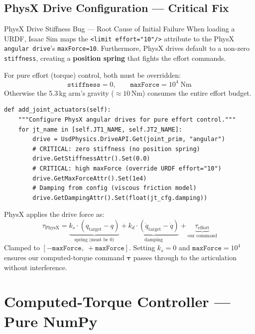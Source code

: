 \documentclass[11pt,a4paper]{article}
\newcommand{\btau}{\bm{\tau}}
\begin{document}
\subsection{PhysX Drive Configuration --- Critical Fix}

\begin{physxbox}{PhysX Drive Stiffness Bug --- Root Cause of Initial Failure}
When loading a URDF, Isaac Sim maps the \texttt{<limit effort="10"/>} attribute to the PhysX \texttt{angular drive}'s \texttt{maxForce=10}. Furthermore, PhysX drives default to a non-zero \texttt{stiffness}, creating a \textbf{position spring} that fights the effort commands.

For pure effort (torque) control, both must be overridden:
\[
    \texttt{stiffness} = 0, \qquad \texttt{maxForce} = 10^4 \;\text{Nm}
\]
Otherwise the 5.3\,kg arm's gravity ($\approx 10$\,Nm) consumes the entire effort budget.
\end{physxbox}

\begin{lstlisting}[caption={PhysX drive fix --- \texttt{robots/cup\_manipulator\_tendon\_isaac.py}}]
def add_joint_actuators(self):
    """Configure PhysX angular drives for pure effort control."""
    for jt_name in [self.JT1_NAME, self.JT2_NAME]:
        drive = UsdPhysics.DriveAPI.Get(joint_prim, "angular")
        # CRITICAL: zero stiffness (no position spring)
        drive.GetStiffnessAttr().Set(0.0)
        # CRITICAL: high maxForce (override URDF effort="10")
        drive.GetMaxForceAttr().Set(1e4)
        # Damping from config (viscous friction model)
        drive.GetDampingAttr().Set(float(jt_cfg.damping))
\end{lstlisting}

\begin{codemath}
PhysX applies the drive force as:
\[
    \tau_{\mathrm{PhysX}} = \underbrace{k_s \cdot (q_{\mathrm{target}} - q)}_{\text{spring (must be 0)}}
    + \underbrace{k_d \cdot (\dot q_{\mathrm{target}} - \dot q)}_{\text{damping}}
    + \underbrace{\tau_{\mathrm{effort}}}_{\text{our command}}
\]
Clamped to $[-\texttt{maxForce},\; +\texttt{maxForce}]$. Setting $k_s = 0$ and $\texttt{maxForce} = 10^4$ ensures our computed-torque command $\btau$ passes through to the articulation without interference.
\end{codemath}


\section{Computed-Torque Controller --- Pure NumPy}
\label{sec:ct}
\end{document}
